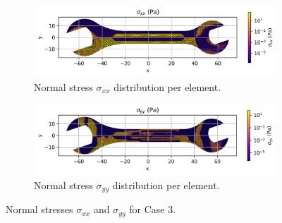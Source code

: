 \begin{figure}[H]
    \centering
    \begin{subfigure}[t]{0.49\textwidth}
        \centering
        \includegraphics[width=\textwidth]{GRAFICOS/Case c - sigma_xx_per_element.png}
        \caption{Normal stress $\sigma_{xx}$ distribution per element.}
        \label{fig:sigma_xx_c}
    \end{subfigure}
    \hfill
    \begin{subfigure}[t]{0.49\textwidth}
        \centering
        \includegraphics[width=\textwidth]{GRAFICOS/Case c - sigma_yy_per_element.png}
        \caption{Normal stress $\sigma_{yy}$ distribution per element.}
        \label{fig:sigma_yy_c}
    \end{subfigure}
    \caption{Normal stresses $\sigma_{xx}$ and $\sigma_{yy}$ for Case 3.}
    \label{fig:normal_stresses_c}
\end{figure}

